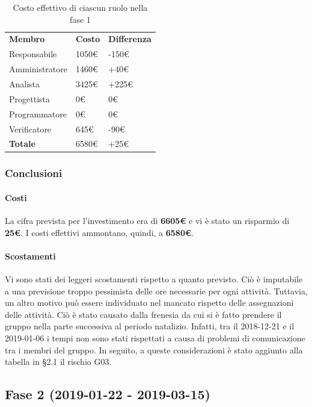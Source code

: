 	\begin{table}[H]
		\centering
		\begin{tabular}{| l | l |l|}
			\rowcolor{LightBlue}
			\textbf{\color{white}Membro}
			& \textbf{\color{white}Costo}
			& \textbf{\color{white}Differenza}\\
			Responsabile 		& 1050€ 	& -150€\\
			Amministratore 	& 1460€ 	& +40€\\
			Analista 				& 3425€ 	& +225€\\
			Progettista 			& 0€ 		& 0€\\
			Programmatore 		& 0€ 		& 0€\\
			Verificatore 		& 645€ 	& -90€\\ \hline
			\textbf{Totale} 	& 6580€ 	& +25€\\ \hline
		\end{tabular}
		\caption{Costo effettivo di ciascun ruolo nella fase 1}
	\end{table}

	\subsubsection{Conclusioni}
		\paragraph{Costi\\}
La cifra prevista per l'investimento era di \textbf{6605€} e vi è stato un risparmio di \textbf{25€}. I costi effettivi ammontano, quindi, a \textbf{6580€}. 
		\paragraph{Scostamenti\\}
Vi sono stati dei leggeri scostamenti rispetto a quanto previsto. Ciò è imputabile a una previsione troppo pessimista delle ore necessarie per ogni attività. Tuttavia, un altro motivo può essere individuato nel mancato rispetto delle assegnazioni delle attività. Ciò è stato causato dalla frenesia da cui si è fatto prendere il gruppo nella parte successiva al periodo natalizio. Infatti, tra il 2018-12-21 e il 2019-01-06 i tempi non sono stati rispettati a causa di problemi di comunicazione tra i membri del gruppo. In seguito, a queste considerazioni è stato aggiunto alla tabella in §2.1 il rischio G03.

\newpage	
\subsection{Fase 2 (2019-01-22 - 2019-03-15)}
